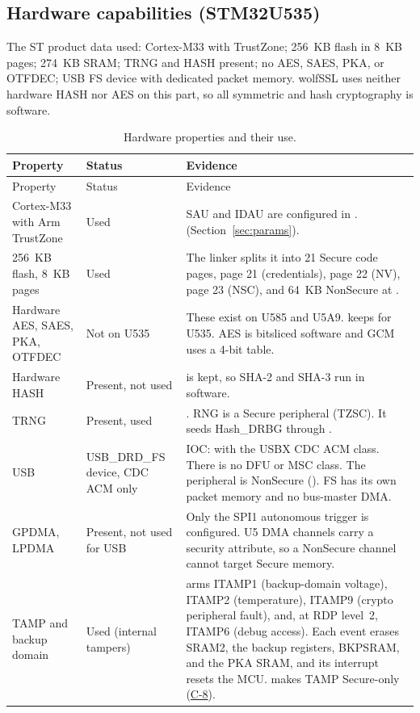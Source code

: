 \documentclass[11pt,a4paper]{article}
\begin{document}
\subsection{Hardware capabilities (STM32U535)}
The ST product data used: Cortex-M33 with TrustZone; 256~KB flash in 8~KB pages; 274~KB SRAM; TRNG and HASH present; no AES, SAES, PKA, or OTFDEC; USB FS device with dedicated packet memory. wolfSSL uses neither hardware HASH nor AES on this part, so all symmetric and hash cryptography is software.
\begin{longtable}{L{4.2cm}L{2.8cm}L{8.6cm}}
\caption{Hardware properties and their use.}\label{tab:hw}\\
\toprule Property & Status & Evidence\\ \midrule\endfirsthead
\toprule Property & Status & Evidence\\ \midrule\endhead
Cortex-M33 with Arm TrustZone & Used & SAU and IDAU are configured in .  (Section~\ref{sec:params}).\\
256~KB flash, 8~KB pages & Used & The linker splits it into 21 Secure code pages, page 21 (credentials), page 22 (NV), page 23 (NSC), and 64~KB NonSecure at .\\
Hardware AES, SAES, PKA, OTFDEC & Not on U535 & These exist on U585 and U5A9.  keeps  for U535. AES is bitsliced software and GCM uses a 4-bit table.\\
Hardware HASH & Present, not used &  is kept, so SHA-2 and SHA-3 run in software.\\
TRNG & Present, used & . RNG is a Secure peripheral (TZSC). It seeds Hash\_DRBG through .\\
USB & USB\_DRD\_FS device, CDC ACM only & IOC:  with the USBX CDC ACM class. There is no DFU or MSC class. The peripheral is NonSecure (). FS has its own packet memory and no bus-master DMA.\\
GPDMA, LPDMA & Present, not used for USB & Only the SPI1 autonomous trigger is configured. U5 DMA channels carry a security attribute, so a NonSecure channel cannot target Secure memory.\\
TAMP and backup domain & Used (internal tampers) &  arms ITAMP1 (backup-domain voltage), ITAMP2 (temperature), ITAMP9 (crypto peripheral fault), and, at RDP level~2, ITAMP6 (debug access). Each event erases SRAM2, the backup registers, BKPSRAM, and the PKA SRAM, and its interrupt resets the MCU.  makes TAMP Secure-only (\hyperref[c:C-8]{C-8}).\\

\end{longtable}
\end{document}
